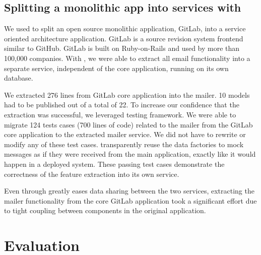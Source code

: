 \subsection{Splitting a monolithic app into services with \synapse}
\label{synapse:sec:apps:gitlab}

We used \synapse to split an open source monolithic application, GitLab, into a
service oriented architecture application. GitLab is a source revision system
frontend similar to GitHub.  GitLab is built on Ruby-on-Rails and used by more
than 100,000 companies.  With \synapse, we were able to extract all email
functionality into a separate service, independent of the core application,
running on its own database.

We extracted 276 lines from GitLab core application into the mailer.  10 models
had to be published out of a total of 22.  To increase our confidence that the
extraction was successful, we leveraged \synapse testing framework. We were able
to migrate 124 tests cases (700 lines of code) related to the mailer from the
GitLab core application to the extracted mailer service.  We did not have to
rewrite or modify any of these test cases.  \synapse transparently reuse the
data factories to mock \synapse messages as if they were received from the main
application, exactly like it would happen in a deployed system. These passing
test cases demonstrate the correctness of the feature extraction into its own
service.

Even through \synapse greatly eases data sharing between the two services,
extracting the mailer functionality from the core GitLab application took
a significant effort due to tight coupling between components in the original
application.


\section{Evaluation}
\label{synapse:sec:evaluation}



